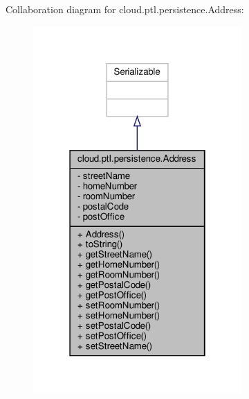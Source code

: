 Collaboration diagram for cloud.\+ptl.\+persistence.\+Address\+:
\nopagebreak
\begin{figure}[H]
\begin{center}
\leavevmode
\includegraphics[width=226pt]{classcloud_1_1ptl_1_1persistence_1_1Address__coll__graph}
\end{center}
\end{figure}
